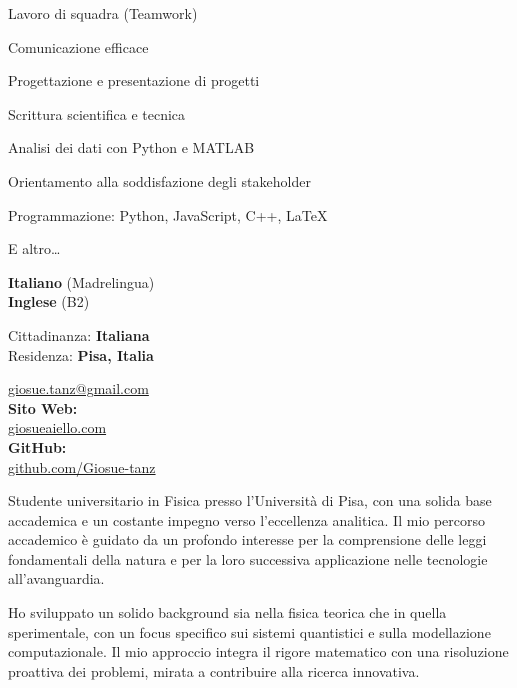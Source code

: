 \documentclass[11pt,a4paper]{article}
\begin{document}
\begin{cvlayout}


\begin{cvskills}
  \item Lavoro di squadra (Teamwork)
  \item Comunicazione efficace
  \item Progettazione e presentazione di progetti
  \item Scrittura scientifica e tecnica
  \item Analisi dei dati con Python e MATLAB
  \item Orientamento alla soddisfazione degli stakeholder
  \item Programmazione: Python, JavaScript, C++, \LaTeX
  \item E altro\dots
\end{cvskills}

\textbf{Italiano} (Madrelingua)\\
\textbf{Inglese} (B2)

Cittadinanza: \textbf{Italiana}\\[2.9bp]
Residenza: \textbf{Pisa, Italia}

{\small
\MVAt{} \href{mailto:giosue.tanz@gmail.com}{giosue.tanz@gmail.com}\\[6.3bp]
\textbf{Sito Web:}\\
\href{https://giosueaiello.com}{giosueaiello.com}\\[6.3bp]
\textbf{GitHub:}\\
\href{https://github.com/Giosue-tanz}{github.com/Giosue-tanz}
}

\cvmaincolumn

\begin{cvprose}
Studente universitario in Fisica presso l'Università di Pisa, con una solida
base accademica e un costante impegno verso l'eccellenza analitica. Il mio
percorso accademico è guidato da un profondo interesse per la comprensione
delle leggi fondamentali della natura e per la loro successiva applicazione
nelle tecnologie all'avanguardia.

Ho sviluppato un solido background sia nella fisica teorica che in quella
sperimentale, con un focus specifico sui sistemi quantistici e sulla
modellazione computazionale. Il mio approccio integra il rigore matematico con
una risoluzione proattiva dei problemi, mirata a contribuire alla ricerca
innovativa.


\end{cvprose}
\end{cvlayout}
\end{document}
